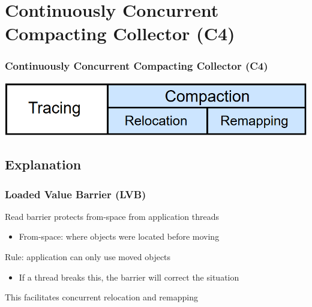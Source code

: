 \documentclass{beamer}
\newcommand{\linespace}{\vskip 0.25cm}
\begin{document}
\section[C4]{Continuously Concurrent Compacting Collector (C4)}

\begin{frame}

\frametitle{Continuously Concurrent Compacting Collector (C4)}

\begin{center}
\includegraphics[width=.85\textwidth]{Illustrations/gc_cycle_locator_compaction.png}
\end{center}

\end{frame}



\subsection*{Explanation}

\begin{frame}

\frametitle{Loaded Value Barrier (LVB)}

Read barrier protects from-space from application threads
\begin{itemize}
\item From-space: where objects were located before moving
\end{itemize}

\linespace
\linespace

Rule: application can only use moved objects
\begin{itemize}
\item If a thread breaks this, the barrier will correct the situation
\end{itemize}

\linespace
\linespace

This facilitates concurrent relocation and remapping

\end{frame}
\end{document}
